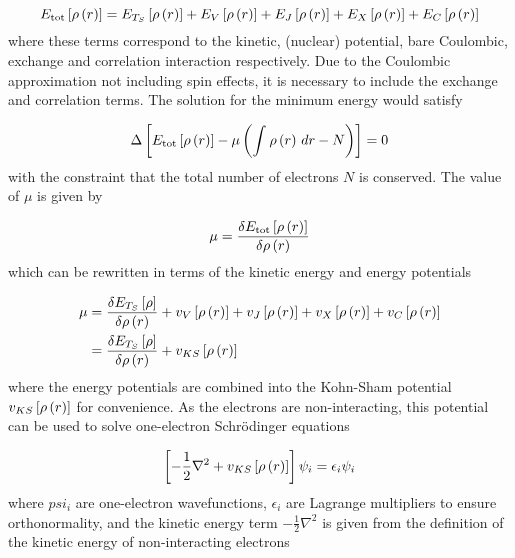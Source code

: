 \begin{equation}
    E_{\text{tot}} \left[ \rho\left(r\right) \right] = E_{T_S} \left[ \rho\left(r\right) \right] + E_{V} \left[ \rho\left(r\right) \right] + E_{J} \left[ \rho\left(r\right) \right] + E_{X} \left[ \rho\left(r\right) \right] + E_{C} \left[ \rho\left(r\right) \right]
\end{equation}
%
where these terms correspond to the kinetic, (nuclear) potential, bare Coulombic,
exchange and correlation interaction respectively. Due to the Coulombic approximation
not including spin effects, it is necessary to include the exchange and correlation
terms. The solution for the minimum energy would satisfy

\begin{equation}
    \Delta \left[  E_{\text{tot}} \left[ \rho\left(r\right) \right]  - \mu \left( \int_{}^{} \rho\left(r\right) \,dr - N \right) \right] = 0
\end{equation}
%
with the constraint that the total number of electrons $N$ is conserved. The value
of $\mu$ is given by

\begin{equation}
    \mu = \frac{\delta  E_{\text{tot}} \left[ \rho\left(r\right) \right]}{\delta \rho\left(r\right)}
\end{equation}
%
which can be rewritten in terms of the kinetic energy and energy potentials

\begin{equation}
    \begin{split}
        \mu &= \frac{\delta  E_{T_S} \left[ \rho \right]}{\delta \rho\left(r\right)} + v_{V} \left[ \rho\left(r\right) \right] + v_{J} \left[ \rho\left(r\right) \right] + v_{X} \left[ \rho\left(r\right) \right] + v_{C} \left[ \rho\left(r\right) \right] \\
            &= \frac{\delta  E_{T_S} \left[ \rho \right]}{\delta \rho\left(r\right)} + v_{KS} \left[ \rho\left(r\right) \right]
    \end{split}
\end{equation}
%
where the energy potentials are combined into the Kohn-Sham potential $v_{KS} \left[ \rho\left(r\right) \right]$ for
convenience. As the electrons are non-interacting, this potential can be used to
solve one-electron Schrödinger equations

\begin{equation}
    \left[ -\frac{1}{2} \nabla^2 + v_{KS} \left[ \rho\left(r\right) \right] \right] \psi_i = \epsilon_i \psi_i
\end{equation}
%
where $psi_i$ are one-electron wavefunctions, $\epsilon_i$ are Lagrange multipliers
to ensure orthonormality, and the kinetic energy term $-\frac{1}{2} \nabla ^2$ is
given from the definition of the kinetic energy of non-interacting electrons

